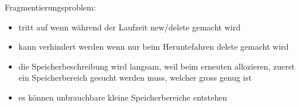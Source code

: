 \begin{tabular}{p{12cm}p{5cm}}

\end{tabular}

Fragmentierungsproblem:
\begin{itemize}
    \item tritt auf wenn während der Laufzeit new/delete gemacht wird
    \item kann verhindert werden wenn nur beim Heruntefahren delete gemacht wird
    \item die Speicherbeschreibung wird langsam, weil beim erneuten allozieren, zuerst ein Speicherbereich gesucht werden muss, welcher gross genug ist
    \item es können unbrauchbare kleine Speicherbereiche entstehen
\end{itemize}





